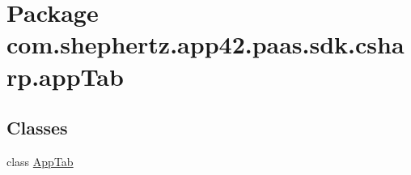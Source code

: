 \hypertarget{namespacecom_1_1shephertz_1_1app42_1_1paas_1_1sdk_1_1csharp_1_1app_tab}{\section{Package com.\+shephertz.\+app42.\+paas.\+sdk.\+csharp.\+app\+Tab}
\label{namespacecom_1_1shephertz_1_1app42_1_1paas_1_1sdk_1_1csharp_1_1app_tab}
}
\subsection*{Classes}
\begin{DoxyCompactItemize}
\item 
class \hyperlink{classcom_1_1shephertz_1_1app42_1_1paas_1_1sdk_1_1csharp_1_1app_tab_1_1_app_tab}{App\+Tab}
\end{DoxyCompactItemize}
